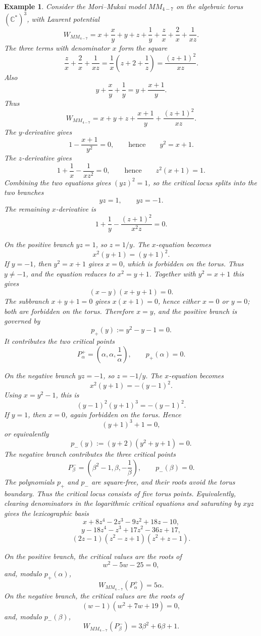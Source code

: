 \documentclass[11pt]{amsart}
\newtheorem{example}{Example}[section]
\begin{document}
\begin{example}
Consider the Mori--Mukai model $MM_{4-7}$ on the algebraic torus
$(\mathbb{C}^*)^3$, with Laurent potential
\[
W_{MM_{4-7}}=x+\frac{x}{y}+y+z+\frac{1}{y}
+\frac{z}{x}+\frac{2}{x}+\frac{1}{xz}.
\]
The three terms with denominator $x$ form the square
\[
\frac{z}{x}+\frac{2}{x}+\frac{1}{xz}
=\frac{1}{x}\left(z+2+\frac{1}{z}\right)
=\frac{(z+1)^2}{xz}.
\]
Also
\[
y+\frac{x}{y}+\frac{1}{y}=y+\frac{x+1}{y}.
\]
Thus
\[
W_{MM_{4-7}}=x+y+z+\frac{x+1}{y}+\frac{(z+1)^2}{xz}.
\]
The $y$-derivative gives
\[
1-\frac{x+1}{y^2}=0,
\qquad\text{hence}\qquad
y^2=x+1.
\]
The $z$-derivative gives
\[
1+\frac{1}{x}-\frac{1}{xz^2}=0,
\qquad\text{hence}\qquad
z^2(x+1)=1.
\]
Combining the two equations gives $(yz)^2=1$, so the critical locus splits
into the two branches
\[
yz=1,
\qquad
yz=-1.
\]
The remaining $x$-derivative is
\[
1+\frac{1}{y}-\frac{(z+1)^2}{x^2z}=0.
\]

On the positive branch $yz=1$, so $z=1/y$. The $x$-equation becomes
\[
x^2(y+1)=(y+1)^2.
\]
If $y=-1$, then $y^2=x+1$ gives $x=0$, which is forbidden on the torus.
Thus $y\neq -1$, and the equation reduces to $x^2=y+1$. Together with
$y^2=x+1$ this gives
\[
(x-y)(x+y+1)=0.
\]
The subbranch $x+y+1=0$ gives $x(x+1)=0$, hence either $x=0$ or $y=0$;
both are forbidden on the torus. Therefore $x=y$, and the positive branch is
governed by
\[
p_+(y):=y^2-y-1=0.
\]
It contributes the two critical points
\[
P^+_\alpha=\left(\alpha,\alpha,\frac{1}{\alpha}\right),
\qquad
p_+(\alpha)=0.
\]

On the negative branch $yz=-1$, so $z=-1/y$. The $x$-equation becomes
\[
x^2(y+1)=-(y-1)^2.
\]
Using $x=y^2-1$, this is
\[
(y-1)^2(y+1)^3=-(y-1)^2.
\]
If $y=1$, then $x=0$, again forbidden on the torus. Hence
\[
(y+1)^3+1=0,
\]
or equivalently
\[
p_-(y):=(y+2)(y^2+y+1)=0.
\]
The negative branch contributes the three critical points
\[
P^-_\beta=\left(\beta^2-1,\beta,-\frac{1}{\beta}\right),
\qquad
p_-(\beta)=0.
\]
The polynomials $p_+$ and $p_-$ are square-free, and their roots avoid the
torus boundary. Thus the critical locus consists of five torus points.
Equivalently, clearing denominators in the logarithmic critical equations and
saturating by $xyz$ gives the lexicographic basis
\[
x+8z^4-2z^3-9z^2+18z-10,
\]
\[
y-18z^4-z^3+17z^2-36z+17,
\]
\[
(2z-1)(z^2-z+1)(z^2+z-1).
\]

On the positive branch, the critical values are the roots of
\[
w^2-5w-25=0,
\]
and, modulo $p_+(\alpha)$,
\[
W_{MM_{4-7}}(P^+_\alpha)=5\alpha.
\]
On the negative branch, the critical values are the roots of
\[
(w-1)(w^2+7w+19)=0,
\]
and, modulo $p_-(\beta)$,
\[
W_{MM_{4-7}}(P^-_\beta)=3\beta^2+6\beta+1.
\]


\end{example}
\end{document}
